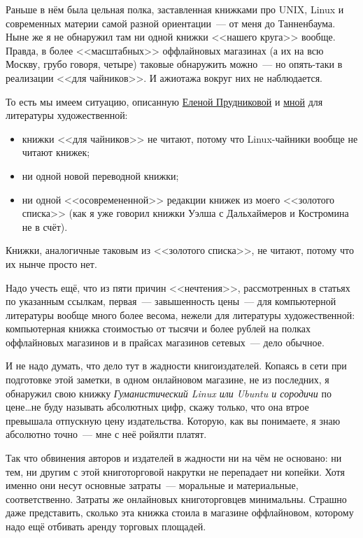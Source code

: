 Раньше в нём была цельная полка, заставленная книжками про UNIX, Linux и современных материи самой разной ориентации~--- от меня до Танненбаума. Ныне же я не обнаружил там ни одной книжки <<нашего круга>> вообще. Правда, в более <<масштабных>> оффлайновых магазинах (а их на всю Москву, грубо говоря, четыре) таковые обнаружить можно~--- но опять-таки в реализации <<для чайников>>. И ажиотажа вокруг них не наблюдается.

То есть мы имеем ситуацию, описанную \href{http://expert.ru/2011/11/15/radostnyij-vzlet-tsunami/}{Еленой Прудниковой}  и \href{http://gistoria.info/?p=160}{мной}  для литературы художественной:

\begin{itemize}
	\item книжки <<для чайников>> не читают, потому что Linux-чайники вообще не читают книжек; 
	\item ни одной новой переводной книжки; 
	\item ни одной <<осовремененной>> редакции книжек из моего <<золотого списка>> (как я уже говорил книжки Уэлша с Дальхаймеров и Костромина не в счёт). 
\end{itemize}

Книжки, аналогичные таковым из <<золотого списка>>, не читают, потому что их нынче просто нет. 

Надо учесть ещё, что из пяти причин <<нечтения>>, рассмотренных в статьях по указанным ссылкам, первая~--- завышенность цены~--- для компьютерной литературы вообще много более весома, нежели для литературы художественной: компьютерная книжка стоимостью от тысячи и более рублей на полках оффлайновых магазинов и в прайсах магазинов сетевых~--- дело обычное.

И не надо думать, что дело тут в жадности книгоиздателей. Копаясь в сети при подготовке этой заметки, в одном онлайновом магазине, не из последних, я обнаружил свою книжку 
\textit{Гуманистический Linux или Ubuntu и сородичи}  по цене\dots не буду называть абсолютных цифр, скажу только, что она втрое превышала отпускную цену издательства. Которую, как вы понимаете, я знаю абсолютно точно~--- мне с неё ройялти платят.

Так что обвинения авторов и издателей в жадности ни на чём не основано: ни тем, ни другим с этой книготорговой накрутки не перепадает ни копейки. Хотя именно они несут основные затраты~--- моральные и материальные, соответственно. Затраты же онлайновых книготорговцев минимальны. Страшно даже представить, сколько эта книжка стоила в магазине оффлайновом, которому надо ещё отбивать аренду торговых площадей.

